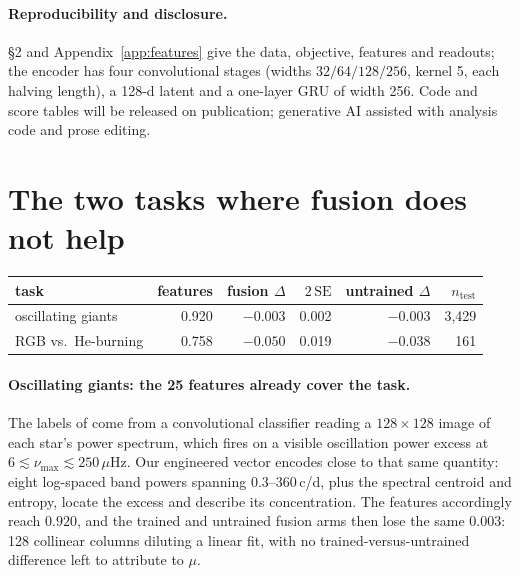 \documentclass{article}
\begin{document}
\paragraph{Reproducibility and disclosure.} \S2 and Appendix~\ref{app:features} give the data,
objective, features and readouts; the encoder has four convolutional stages (widths $32/64/128/256$,
kernel 5, each halving length), a 128-d latent and a one-layer GRU of width 256. Code and score
tables will be released on publication; generative AI assisted with analysis code and prose editing.

\raggedbottom



\appendix

\section{The two tasks where fusion does not help}
\label{app:negatives}

\begin{center}
\small
\begin{tabular}{lrrrrr}
\toprule
task & features & fusion $\Delta$ & $2\,\mathrm{SE}$ & untrained $\Delta$ & $n_{\mathrm{test}}$ \\
\midrule
oscillating giants & 0.920 & $-0.003$ & 0.002 & $-0.003$ & 3{,}429 \\
RGB vs.\ He-burning & 0.758 & $-0.050$ & 0.019 & $-0.038$ & 161 \\
\bottomrule
\end{tabular}
\end{center}

\paragraph{Oscillating giants: the 25 features already cover the task.} The labels of
\citet{hon2021} come from a convolutional classifier reading a $128 \times 128$ image of each star's
power spectrum, which fires on a visible oscillation power excess at
$6 \lesssim \nu_{\max} \lesssim 250\,\mu$Hz. Our engineered vector encodes close to that same
quantity: eight log-spaced band powers spanning 0.3--360\,c/d, plus the spectral centroid and
entropy, locate the excess and describe its concentration. The features accordingly reach $0.920$,
and the trained and untrained fusion arms then lose the same $0.003$: 128 collinear columns
diluting a linear fit, with no trained-versus-untrained difference left to attribute to $\mu$.
\end{document}

